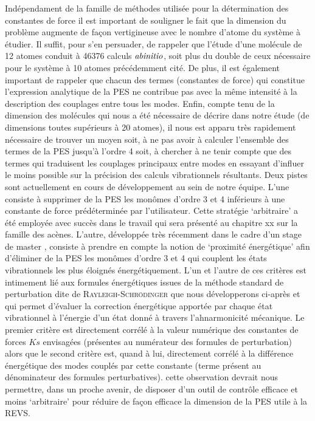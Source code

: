 Indépendament de la famille de méthodes utilisée pour la détermination des constantes de force il est important de souligner le fait que la dimension du problème augmente de façon vertigineuse avec le nombre d’atome du système à étudier. Il suffit, pour s’en persuader, de rappeler que l’étude d’une molécule de 12 atomes conduit à 46376 calculs $\it{ab initio}$, soit plus du double de ceux nécessaire pour le système à 10 atomes précédemment cité. De plus, il est également important de rappeler que chacun des termes (constantes de force) qui constitue l’expression analytique de la PES ne contribue pas avec la même intensité à la description des couplages entre tous les modes. Enfin, compte tenu de la dimension des molécules qui nous a été nécessaire de décrire dans notre étude (de dimensions toutes supérieurs à 20 atomes), il nous est apparu très rapidement nécessaire de trouver un moyen soit, à ne pas avoir à calculer l’ensemble des termes de la PES jusqu’à l’ordre 4 soit, à chercher à ne tenir compte que des termes qui traduisent les couplages principaux entre modes en essayant d’influer le moins possible sur la précision des calculs vibrationnels résultants. Deux pistes sont actuellement en cours de développement au sein de  notre équipe. L’une consiste à supprimer de la PES les monômes d’ordre 3 et 4 inférieurs à une constante de force prédéterminée par l’utilisateur. Cette stratégie ‘arbitraire’ a été employée avec succès dans le travail qui sera présenté au chapitre xx sur la famille des acènes. L’autre, développée très récemment dans le cadre d’un stage de master \cite{fradet2016}, consiste à prendre en compte la notion de ‘proximité énergétique’ afin d’éliminer de la PES les monômes d’ordre 3 et 4 qui couplent les états vibrationnels les plus éloignés énergétiquement. L’un et l’autre de ces critères est intimement lié aux formules énergétiques issues de la méthode standard de perturbation dite de \textsc{Rayleigh-Schrödinger} que nous développerons ci-après et qui permet d’évaluer la correction énergétique apportée par chaque état vibrationnel à l’énergie d’un état donné à travers l’ahnarmonicité mécanique. Le premier critère est directement corrélé à la valeur numérique des constantes de forces $Ks$ envisagées (présentes au numérateur des formules de perturbation) alors que le second critère est, quand à lui, directement corrélé à la différence énergétique des modes couplés par cette constante (terme présent au dénominateur des formules perturbatives). cette observation devrait nous permettre, dans un proche avenir, de disposer d’un outil de contrôle efficace et moins ‘arbitraire’ pour réduire de façon efficace la dimension de la PES utile à la REVS. 

